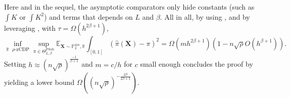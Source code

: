 \documentclass[10pt]{article} %
\newcommand{\Prob}[0]{\mathbb{P}}
\newcommand{\E}[0]{\mathbb{E}}
\newcommand\vect[1]{\mathbf{#1}}
\newcommand\tv[2]{\mathrm{TV}\left( {#1}, {#2} \right)}
\newcommand\p[1]{\left( {#1}\right)}
\newcommand\RG[1]{\textcolor{red}{#1}}
\begin{document}

Here and in the sequel, the asymptotic comparators only hide constants (such as $\int K$ or $\int K^2$) and terms that depends on $L$ and $\beta$.
All in all, by using ,  and by leveraging , with $\tau = \Omega(h^{2\beta+1})$, 
\begin{equation}
    \inf_{\hat{\pi} \text{ $\rho$-zCDP}} \sup_{\pi \in  \Theta^{\text{PSob}}_{L, \beta}}
    \E_{\vect{X} \sim \Prob_{\pi}^{\otimes n}, \hat{\pi}} \int_{[0, 1]}\p{\hat{\pi}(\vect{X})- \pi}^2 = \Omega \p{m h^{2 \beta + 1}} \p{1 - n \sqrt{\rho} O \p{h^{\beta + 1}}}.
\end{equation}
Setting $h \approx \p{n \sqrt{\rho}}^{\frac{-1}{\beta + 1}}$ and $m = c/h$ for $c$ small enough concludes the proof by yielding a lower bound $\Omega\p{\p{n\sqrt{\rho}}^{-\frac{2\beta}{2\beta+1}}}$.
\end{document}
